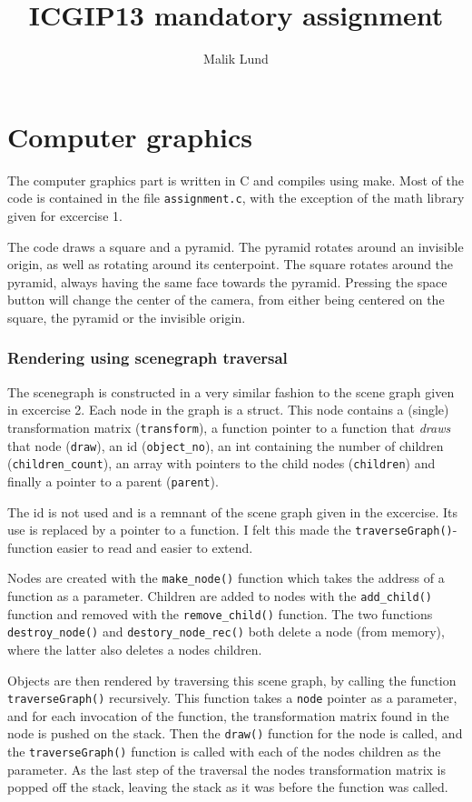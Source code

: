 \documentclass[10pt,a4paper]{article}
\author{Malik Lund}
\title{ICGIP13 mandatory assignment}
\begin{document}
\part{Computer graphics}
The computer graphics part is written in C and compiles using make. Most of the code is contained in the file \texttt{assignment.c}, with the exception of the math library given for excercise 1.

The code draws a square and a pyramid. The pyramid rotates around an invisible origin, as well as rotating around its centerpoint. The square rotates around the pyramid, always having the same face towards the pyramid. Pressing the space button will change the center of the camera, from either being centered on the square, the pyramid or the invisible origin.

\section{Rendering using scenegraph traversal}

The scenegraph is constructed in a very similar fashion to the scene graph given in excercise 2. Each node in the graph is a struct. This node contains a (single) transformation matrix (\texttt{transform}), a function pointer to a function that \emph{draws} that node (\texttt{draw}), an id (\texttt{object\_no}), an int containing the number of children (\texttt{children\_count}), an array with pointers to the child nodes (\texttt{children}) and finally a pointer to a parent (\texttt{parent}).

The id is not used and is a remnant of the scene graph given in the excercise. Its use is replaced by a pointer to a function. I felt this made the \texttt{traverseGraph()}-function easier to read and easier to extend.

Nodes are created with the \texttt{make\_node()} function which takes the address of a function as a parameter. Children are added to nodes with the \texttt{add\_child()} function and removed with the \texttt{remove\_child()} function. The two functions \texttt{destroy\_node()} and \texttt{destory\_node\_rec()} both delete a node (from memory), where the latter also deletes a nodes children.

Objects are then rendered by traversing this scene graph, by calling the function \texttt{traverseGraph()} recursively. This function takes a \texttt{node} pointer as a parameter, and for each invocation of the function, the transformation matrix found in the node is pushed on the stack. Then the \texttt{draw()} function for the node is called, and the \texttt{traverseGraph()} function is called with each of the nodes children as the parameter. As the last step of the traversal the nodes transformation matrix is popped off the stack, leaving the stack as it was before the function was called.
\end{document}

